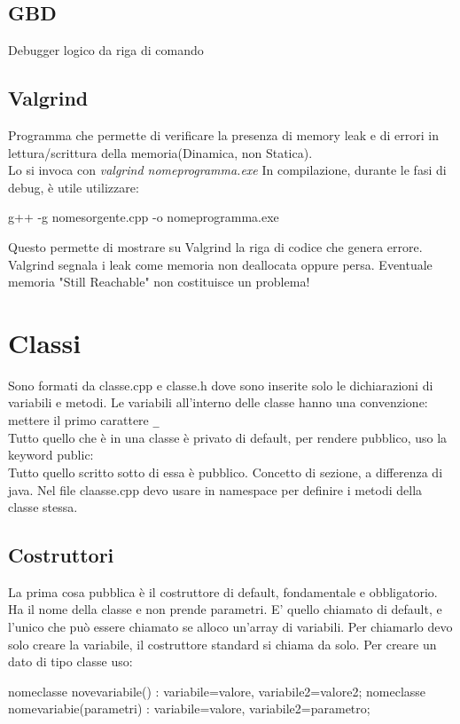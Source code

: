 \section{GBD}
Debugger logico da riga di comando

\section{Valgrind}
Programma che permette di verificare la presenza di memory leak e di errori in lettura/scrittura della memoria(Dinamica, non Statica).\\
Lo si invoca con \textit{valgrind nomeprogramma.exe}
In compilazione, durante le fasi di debug, è utile utilizzare:

\begin{tcolorbox}
g++ -g nomesorgente.cpp -o nomeprogramma.exe
\end{tcolorbox}

Questo permette di mostrare su Valgrind la riga di codice che genera errore.
Valgrind segnala i leak come memoria non deallocata oppure persa. Eventuale memoria "Still Reachable" non costituisce un problema!

\chapter{Classi}
Sono formati da classe.cpp e classe.h dove sono inserite solo le dichiarazioni di variabili e metodi. Le variabili all'interno delle classe hanno una convenzione: mettere il primo carattere \verb|_|\\
Tutto quello che è in una classe è privato di default, per rendere pubblico, uso la keyword public:\\
Tutto quello scritto sotto di essa è pubblico. Concetto di sezione, a differenza di java.
Nel file claasse.cpp devo usare in namespace per definire i metodi della classe stessa.

\section{Costruttori}
La prima cosa pubblica è il costruttore di default, fondamentale e obbligatorio. Ha il nome della classe e non prende parametri.
E' quello chiamato di default, e l'unico che può essere chiamato se alloco un'array di variabili. Per chiamarlo devo solo creare la variabile, il costruttore standard si chiama da solo.
Per creare un dato di tipo classe uso:

\begin{cpp}
nomeclasse novevariabile() : variabile=valore, variabile2=valore2;
nomeclasse nomevariabie(parametri) : variabile=valore, variabile2=parametro;
\end{cpp}

